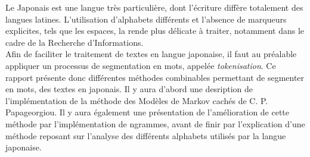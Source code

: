 
Le Japonais est une langue très particulière, dont l'écriture diffère totalement des langues latines. L'utilisation d'alphabets différents et l'absence de marqueurs explicites, tels que les espaces, la rende plus délicate à traiter, notamment dans le cadre de la Recherche d'Informations.\\

Afin de faciliter le traitement de textes en langue japonaise, il faut au préalable appliquer un processus de segmentation en mots, appelée \textit{tokenisation}. Ce rapport présente donc différentes méthodes combinables permettant de segmenter en mots, des textes en japonais. Il y aura d'abord une desription de l'implémentation de la méthode des Modèles de Markov cachés de C. P. Papageorgiou\cite{Papageorgiou:001}. Il y aura également une présentation de l'amélioration de cette méthode par l'implémentation de ngrammes, avant de finir par l'explication d'une méthode reposant sur l'analyse des différents alphabets utilisés par la langue japonaise.\\
